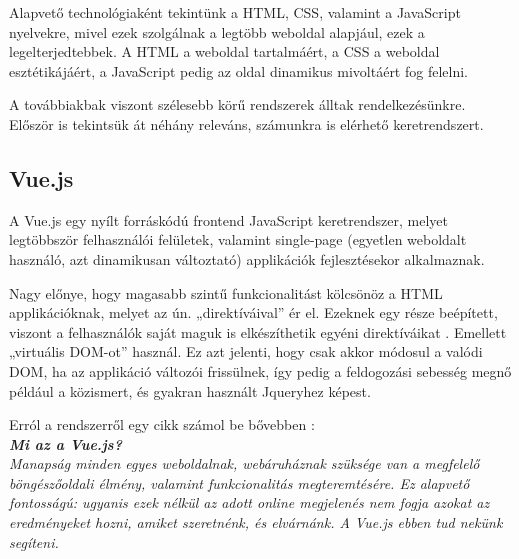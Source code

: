 
Alapvető technológiaként tekintünk a HTML, CSS, valamint a JavaScript nyelvekre, mivel ezek szolgálnak a legtöbb weboldal alapjául, ezek a legelterjedtebbek. A HTML a weboldal tartalmáért, a CSS a weboldal esztétikájáért, a JavaScript pedig az oldal dinamikus mivoltáért fog felelni.

A továbbiakbak viszont szélesebb körű rendszerek álltak rendelkezésünkre. Először is tekintsük át néhány releváns, számunkra is elérhető keretrendszert.




\subsection{Vue.js}

A Vue.js egy nyílt forráskódú frontend JavaScript keretrendszer, melyet legtöbbször felhasználói felületek, valamint single-page (egyetlen weboldalt használó, azt dinamikusan változtató) applikációk fejlesztésekor alkalmaznak.

Nagy előnye, hogy magasabb szintű funkcionalitást kölcsönöz a HTML applikációknak, melyet az ún. „direktíváival” ér el. Ezeknek egy része beépített, viszont a felhasználók saját maguk is elkészíthetik egyéni direktíváikat \cite{w3schoolsvue}. Emellett „virtuális DOM-ot” használ. Ez azt jelenti, hogy csak akkor módosul a valódi DOM, ha az applikáció változói frissülnek, így pedig a feldogozási sebesség megnő például a közismert, és gyakran használt Jqueryhez képest.

Erról a rendszerről egy cikk számol be bővebben \cite{vuecikk}:\\

\noindent\textit{\textbf{\large{Mi az a Vue.js?}}}\\

\textit{Manapság minden egyes weboldalnak, webáruháznak szüksége van a megfelelő böngészőoldali élmény, valamint funkcionalitás megteremtésére. Ez alapvető fontosságú: ugyanis ezek nélkül az adott online megjelenés nem fogja azokat az eredményeket hozni, amiket szeretnénk, és elvárnánk. A Vue.js ebben tud nekünk segíteni.}

